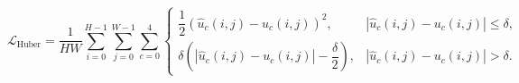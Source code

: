 \documentclass[preprint,review,12pt,numafflabel]{elsarticle}
\begin{document}

\begin{equation*}
\mathcal{L}_{\text{Huber}}
=
\frac{1}{HW}
\sum_{i=0}^{H-1}
\sum_{j=0}^{W-1}
\sum_{c=0}^{4}
\begin{cases}
\dfrac{1}{2}\left(\hat{u}_c(i,j)-u_c(i,j)\right)^2,
&
\left|\hat{u}_c(i,j)-u_c(i,j)\right|\le\delta,
\\[2ex]
\delta\left(
\left|\hat{u}_c(i,j)-u_c(i,j)\right|
-\dfrac{\delta}{2}
\right),
&
\left|\hat{u}_c(i,j)-u_c(i,j)\right|>\delta.
\end{cases}
\end{equation*}

\end{document}
